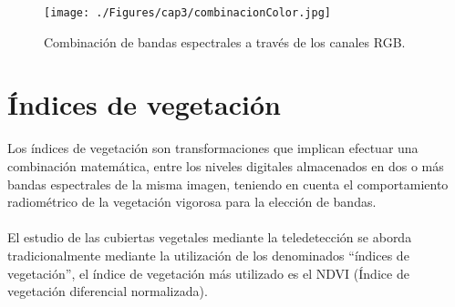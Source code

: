   \begin{figure}[H]
  	\centering
  	\texttt{[image: ./Figures/cap3/combinacionColor.jpg]}
  	\caption{Combinaci\'on de bandas espectrales a trav\'es de los canales RGB.}
  	\label{fig:combinacionColor}
  \end{figure}

 
\section{\'Indices de vegetaci\'on}
Los \'indices de vegetaci\'on son transformaciones que implican efectuar una combinaci\'on matem\'atica, entre los niveles digitales almacenados en dos o m\'as bandas espectrales de la misma imagen, teniendo en cuenta el comportamiento radiom\'etrico de la vegetaci\'on vigorosa para la elecci\'on de bandas\cite{speranza2005potencialidad}. \\~\\
El estudio de las cubiertas vegetales mediante la teledetecci\'on se aborda tradicionalmente mediante la utilización de los denominados “índices de vegetaci\'on”, el índice de vegetaci\'on m\'as utilizado es el NDVI (\'Indice de vegetaci\'on diferencial normalizada)\cite{sader2000estimacion}.

